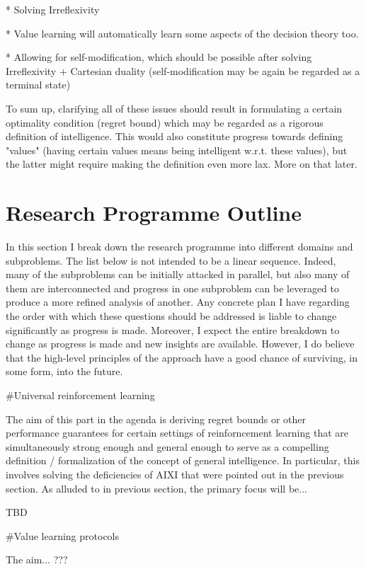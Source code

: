 \documentclass[a4paper]{article}
\begin{document}
* Solving Irreflexivity

* Value learning will automatically learn some aspects of the decision theory too.

* Allowing for self-modification, which should be possible after solving Irreflexivity + Cartesian duality (self-modification may be again be regarded as a terminal state)

To sum up, clarifying all of these issues should result in formulating a certain optimality condition (regret bound) which may be regarded as a rigorous definition of intelligence. This would also constitute progress towards defining "values" (having certain values means being intelligent w.r.t. these values), but the latter might require making the definition even more lax. More on that later.

\section{Research Programme Outline}

In this section I break down the research programme into different domains and subproblems. The list below is not intended to be a linear sequence. Indeed, many of the subproblems can be initially attacked in parallel, but also many of them are interconnected and progress in one subproblem can be leveraged to produce a more refined analysis of another. Any concrete plan I have regarding the order with which these questions should be addressed is liable to change significantly as progress is made. Moreover, I expect the entire breakdown to change as progress is made and new insights are available. However, I do believe that the high-level principles of the approach have a good chance of surviving, in some form, into the future.

\#Universal reinforcement learning

The aim of this part in the agenda is deriving regret bounds or other performance guarantees for certain settings of reinforncement learning that are simultaneously strong enough and general enough to serve as a compelling definition / formalization of the concept of general intelligence. In particular, this involves solving the deficiencies of AIXI that were pointed out in the previous section. As alluded to in previous section, the primary focus will be...

TBD

\#Value learning protocols

The aim... ???
\end{document}

